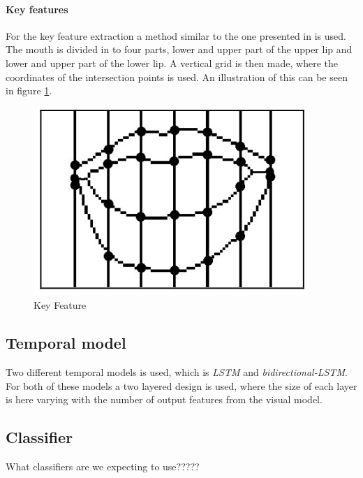 \paragraph{Key features}
For the key feature extraction a method similar to the one presented in \cite{Li2008} is used.
The mouth is divided in to four parts, lower and upper part of the upper lip and lower and upper part of the lower lip.
A vertical grid is then made, where the coordinates of the intersection points is used.
An illustration of this can be seen in figure \ref{fig:keyFeature}.
\begin{figure}[h]
    \centering
    \includegraphics[width=0.5\columnwidth]{fig/keyFeature.jpg}
    \caption{Key Feature}
    \label{fig:keyFeature}
\end{figure}

\subsection{Temporal model}
Two different temporal models is used, which is \textit{LSTM} and \textit{bidirectional-LSTM}.
For both of these models a two layered design is used, where the size of each layer is here varying with the number of output features from the visual model.

\subsection{Classifier}
What classifiers are we expecting to use?????


